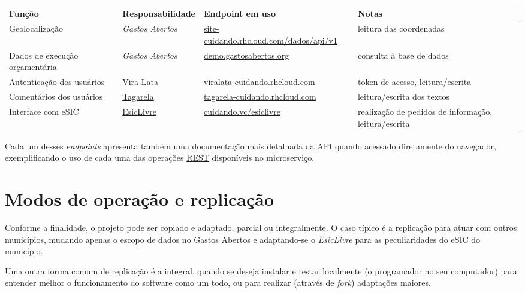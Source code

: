 \documentclass[letterpaper,10pt,portuges]{sphinxmanual}
\begin{document}
\begin{tabulary}{\linewidth}{|L|L|L|L|}
\hline
\textsf{\relax 
Função
} & \textsf{\relax 
Responsabilidade
} & \textsf{\relax 
\textbf{Endpoint} em uso
} & \textsf{\relax 
Notas
}\\
\hline
Geolocalização
 & 
\emph{Gastos Abertos}
 & 
\href{https://site-cuidando.rhcloud.com/dados/api/v1}{site-cuidando.rhcloud.com/dados/api/v1}
 & 
leitura das coordenadas
\\
\hline
Dados de execução orçamentária
 & 
\emph{Gastos Abertos}
 & 
\href{http://demo.gastosabertos.org}{demo.gastosabertos.org}
 & 
consulta à base de dados
\\
\hline
Autenticação dos usuários
 & 
\href{https://github.com/okfn-brasil/viralata}{Vira-Lata}
 & 
\href{https://viralata-cuidando.rhcloud.com}{viralata-cuidando.rhcloud.com}
 & 
token de acesso, leitura/escrita
\\
\hline
Comentários dos usuários
 & 
\href{https://github.com/okfn-brasil/tagarela}{Tagarela}
 & 
\href{https://tagarela-cuidando.rhcloud.com}{tagarela-cuidando.rhcloud.com}
 & 
leitura/escrita dos textos
\\
\hline
Interface com eSIC
 & 
\href{https://github.com/okfn-brasil/esiclivre}{EsicLivre}
 & 
\href{https://cuidando.vc/esiclivre}{cuidando.vc/esiclivre}
 & 
realização de pedidos de informação, leitura/escrita
\\
\hline\end{tabulary}


Cada um desses \emph{endpoints} apresenta também uma documentação mais
detalhada da API quando acessado diretamente do navegador,
exemplificando o uso de cada uma das operações
\href{https://en.wikipedia.org/wiki/Representational\_state\_transfer}{REST}
disponíveis no microserviço.


\chapter{Modos de operação e replicação}
\label{index:modos-de-operacao-e-replicacao}
Conforme a finalidade, o projeto pode ser copiado e adaptado, parcial ou
integralmente. O caso típico é a replicação para atuar com outros
municípios, mudando apenas o escopo de dados no Gastos Abertos e
adaptando-se o \emph{EsicLivre} para as peculiaridades do eSIC do município.

Uma outra forma comum de replicação é a integral, quando se deseja
instalar e testar localmente (o programador no seu computador) para
entender melhor o funcionamento do software como um todo, ou para
realizar (através de \emph{fork}) adaptações maiores.
\end{document}
